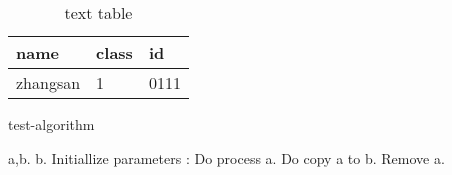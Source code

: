 \documentclass[conference]{IEEEtran}
\begin{document}
\begin{table}
	\centering
	\caption{text table}
	\begin{tabular}{l|l|l}
	\hline
	name & class & id\\
	\hline
	zhangsan & 1 &0111\\
	\hline
	\end{tabular}
\end{table}


\begin{algorithm}
	\caption{test-algorithm}
	\begin{algorithmic}
		\Require a,b.
		\Ensure b.
		\State Initiallize parameters
		:
		\State Do process a.
			\State Do copy a to b.
			\State Remove a.
		\EndIf
		\EndFor
		
	\end{algorithmic}
	
\end{algorithm}
\end{document}
